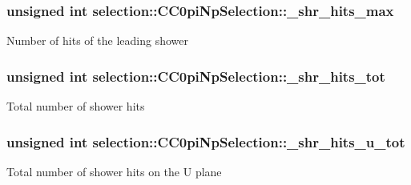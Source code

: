 \subsubsection[{\texorpdfstring{\+\_\+shr\+\_\+hits\+\_\+max}{_shr_hits_max}}]{\setlength{\rightskip}{0pt plus 5cm}unsigned int selection\+::\+C\+C0pi\+Np\+Selection\+::\+\_\+shr\+\_\+hits\+\_\+max\hspace{0.3cm}{\ttfamily [private]}}\hypertarget{classselection_1_1CC0piNpSelection_a750834ef52299d85f9596bbbafa1dffb}{}\label{classselection_1_1CC0piNpSelection_a750834ef52299d85f9596bbbafa1dffb}
Number of hits of the leading shower 
\subsubsection[{\texorpdfstring{\+\_\+shr\+\_\+hits\+\_\+tot}{_shr_hits_tot}}]{\setlength{\rightskip}{0pt plus 5cm}unsigned int selection\+::\+C\+C0pi\+Np\+Selection\+::\+\_\+shr\+\_\+hits\+\_\+tot\hspace{0.3cm}{\ttfamily [private]}}\hypertarget{classselection_1_1CC0piNpSelection_aa6e7162371e3e343df001f0afc8a20b8}{}\label{classselection_1_1CC0piNpSelection_aa6e7162371e3e343df001f0afc8a20b8}
Total number of shower hits 
\subsubsection[{\texorpdfstring{\+\_\+shr\+\_\+hits\+\_\+u\+\_\+tot}{_shr_hits_u_tot}}]{\setlength{\rightskip}{0pt plus 5cm}unsigned int selection\+::\+C\+C0pi\+Np\+Selection\+::\+\_\+shr\+\_\+hits\+\_\+u\+\_\+tot\hspace{0.3cm}{\ttfamily [private]}}\hypertarget{classselection_1_1CC0piNpSelection_afba4a31f84c2f125323b90f007bda1c6}{}\label{classselection_1_1CC0piNpSelection_afba4a31f84c2f125323b90f007bda1c6}
Total number of shower hits on the U plane 
